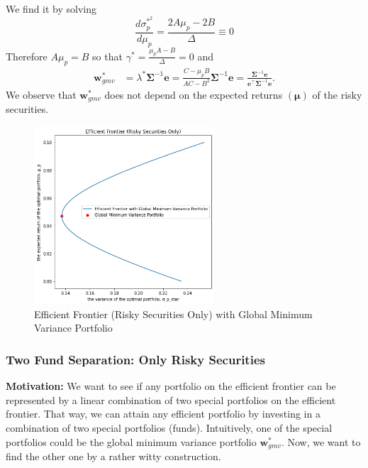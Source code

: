 \documentclass[13pt]{article}
\theoremstyle{definition}
\theoremstyle{remark}
\newenvironment{remark}
  {\pushQED{\qed}\renewcommand{\qedsymbol}{$\triangle$}\remarkx}
  {\popQED\endremarkx}
\begin{document}
We find it by solving
$$
\frac{d \sigma_p^{*^2}}{d \mu_p}=\frac{2 A \mu_p-2 B}{\Delta} \equiv 0
$$
Therefore $A \mu_p=B$ so that $\gamma^{*}=\frac{\mu_p A-B}{\Delta}=0$ and
\begin{align}
\bm{w}_{gmv}^{*} & =\lambda^{*} \mathbf{\Sigma}^{-1} \bm{e}=\frac{C-\mu_p B}{A C-B^{2}} \mathbf{\Sigma}^{-1} \bm{e}=\frac{\mathbf{\Sigma}^{-1} \bm{e}}{\bm{e}^{\top} \mathbf{\Sigma}^{-1} \bm{e}} .
\end{align}
\begin{remark}
    We observe that $\bm{w}_{gmv}^{*}$ does not depend on the expected returns $(\bm{\mu})$ of the risky securities.
\end{remark}
\begin{figure}[!htp]
    \centering
    \includegraphics[width=0.6\textwidth]{Global Minimum Variance Portfolio.png}
    \caption{Efficient Frontier (Risky Securities Only) with Global Minimum Variance Portfolio}
    \label{fig:Global Minimum Variance Portfolio}
\end{figure}

\subsubsection{Two Fund Separation: Only Risky Securities}
{\color{C6}\textbf{Motivation:} We want to see if any portfolio on the efficient frontier can be represented by a linear combination of two special portfolios on the efficient frontier. That way, we can attain any efficient portfolio by investing in a combination of two special portfolios (funds). Intuitively, one of the special portfolios could be the global minimum variance portfolio $\bm{w}_{gmv}^{*}$. Now, we want to find the other one by a rather witty construction.}
\end{document}
